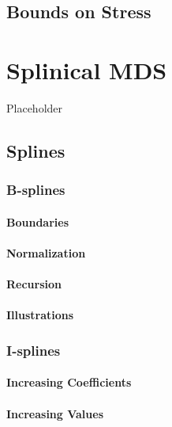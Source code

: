 \documentclass[
  12pt,
]{book}
\begin{document}
\section{Bounds on Stress}\label{bounds-on-stress}

\chapter{Splinical MDS}\label{chsplinical}

Placeholder

\section{Splines}\label{mathsplines}

\subsection{B-splines}\label{mathbsplines}

\subsubsection{Boundaries}\label{mathbboundaries}

\subsubsection{Normalization}\label{mathbnormalize}

\subsubsection{Recursion}\label{mathbrecursion}

\subsubsection{Illustrations}\label{illustrations}

\subsection{I-splines}\label{mathisplines}

\subsubsection{Increasing Coefficients}\label{increasing-coefficients}

\subsubsection{Increasing Values}\label{increasing-values}
\end{document}
